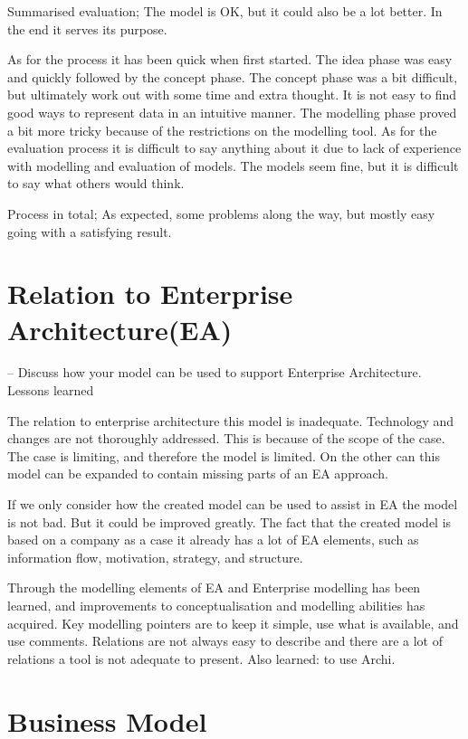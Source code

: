 \documentclass[12pt, a4paper]{article}
\begin{document}
Summarised evaluation; The model is OK, but it could also be a lot better. In
the end it serves its purpose. 

As for the process it has been quick when first started. The idea phase was
easy and quickly followed by the concept phase. The concept phase was a bit
difficult, but ultimately work out with some time and extra thought. It is not
easy to find good ways to represent data in an intuitive manner. The
modelling phase proved a bit more tricky because of the restrictions on the
modelling tool. As for the evaluation process it is difficult to say anything
about it due to lack of experience with modelling and evaluation of models. The
models seem fine, but it is difficult to say what others would think. 

Process in total; As expected, some problems along the way, but mostly easy
going with a satisfying result.  

\section{Relation to Enterprise Architecture(EA)}
– Discuss how your model can be used to support Enterprise Architecture.
Lessons learned

The relation to enterprise architecture this model is inadequate. Technology
and changes are not thoroughly addressed. This is because of the scope of the
case. The case is limiting, and therefore the model is limited. On the other can
this model can be expanded to contain missing parts of an EA approach.

If we only consider how the created model can be used to assist in EA the model
is not bad. But it could be improved greatly. The fact that the created model
is based on a company as a case it already has a lot of EA elements, such as
information flow, motivation, strategy, and structure.

Through the modelling elements of EA and Enterprise modelling has been learned,
and improvements to conceptualisation and modelling abilities has acquired. Key
modelling pointers are to keep it simple, use what is available, and use
comments. Relations are not always easy to describe and there are a lot of
relations a tool is not adequate to present. Also learned: to use Archi. 

\section{Business Model}
\end{document}
